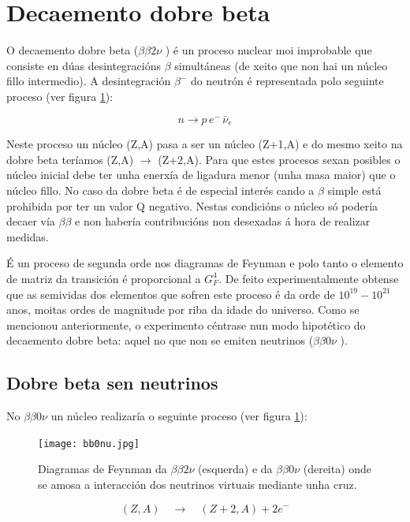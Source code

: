 \documentclass[a4paper,12pt]{article}
\newcommand{\bbcn}[0]{$\beta\beta0\nu$ }
\newcommand{\bbdn}[0]{$\beta\beta2\nu$ }
\begin{document}
\section{Decaemento dobre beta}\label{dobrebeta}

O decaemento dobre beta (\bbdn) é un proceso nuclear moi improbable que consiste en dúas desintegracións $\beta$ simultáneas (de xeito que non hai un núcleo fillo intermedio). A desintegración $\beta^-$ do neutrón é representada polo seguinte proceso (ver figura \ref{bbcn}):

$$ n \rightarrow p \, e^- \, \bar\nu_e $$

Neste proceso un núcleo (Z,A) pasa a ser un núcleo (Z+1,A) e do mesmo xeito na dobre beta teríamos (Z,A) $\rightarrow$ (Z+2,A). Para que estes procesos sexan posibles o núcleo inicial debe ter unha enerxía de ligadura menor (unha masa maior) que o núcleo fillo. No caso da dobre beta é de especial interés cando a $\beta$ simple está prohibida por ter un valor Q negativo. Nestas condicións o núcleo só podería decaer vía $\beta\beta$ e non habería contribucións non desexadas á hora de realizar medidas.

É un proceso de segunda orde nos diagramas de Feynman  e polo tanto o elemento de matriz da transición é proporcional a $G_F^4$. De feito experimentalmente obtense que as semividas dos elementos que sofren este proceso é da orde de $10^{19} - 10^{21}$ anos, moitas ordes de magnitude por riba da idade do universo. Como se mencionou anteriormente, o experimento céntrase nun modo hipotético do decaemento dobre beta: aquel no que non se emiten neutrinos (\bbcn).

\subsection{Dobre beta sen neutrinos}

No \bbcn un núcleo realizaría o seguinte proceso (ver figura \ref{bbcn}):

\begin{figure}[!]
\centering
\texttt{[image: bb0nu.jpg]}
\caption{Diagramas de Feynman da \bbdn (esquerda) e da \bbcn (dereita) onde se amosa a interacción dos neutrinos virtuais mediante unha cruz. }
\label{bbcn}
\end{figure}
$$ (Z,A) \quad \rightarrow \quad (Z+2,A) + 2e^- $$
\end{document}
